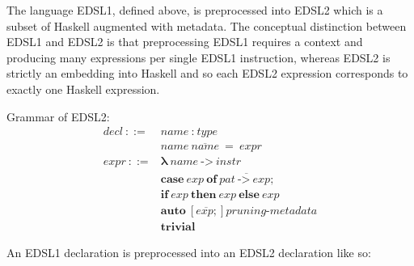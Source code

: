 The language EDSL1, defined above, is preprocessed into EDSL2 which is a subset of Haskell augmented with metadata. 
The conceptual distinction between EDSL1 and EDSL2 is that preprocessing EDSL1 requires a context and producing many expressions per single EDSL1 instruction, whereas EDSL2 is strictly an embedding into Haskell and so each EDSL2 expression corresponds to exactly one Haskell expression.

Grammar of EDSL2:
\begin{align*}
  \textit{decl}~ ::= &
    \textit{name} ~ : ~ \textit{type} \\ &
    \textit{name} ~ \overline{\textit{name}} ~ = ~ \textit{expr}
  \\
  \textit{expr}~ ::= &
    \mathbf{\lambda} ~ \textit{name} ~ \textbf{->} ~ \textit{instr} \\ &
    \textbf{case} ~ \textit{exp} ~ \textbf{of} ~ \overline{\textit{pat} ~ \textbf{->} ~ \textit{exp} ;} \\ & 
    \textbf{if} ~ \textit{exp} ~ \textbf{then} ~ \textit{exp} ~ \textbf{else} ~ \textit{exp} \\ & 
    \textbf{auto} ~ [\overline{\textit{exp} ;}] \textit{pruning-metadata} \\ & 
    \textbf{trivial}
\end{align*}

An EDSL1 declaration is preprocessed into an EDSL2 declaration like so:

